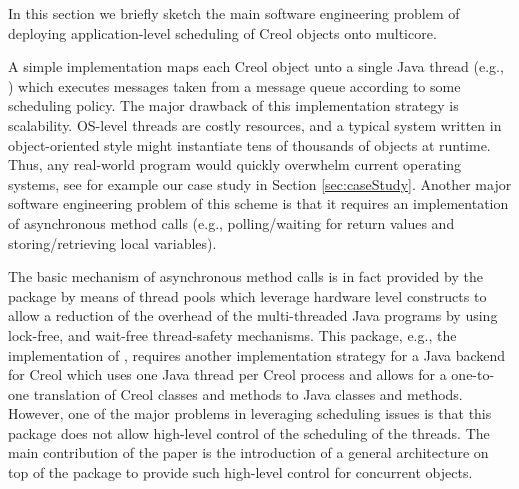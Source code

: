 In this section we briefly sketch the main software engineering problem of deploying 
application-level scheduling of Creol objects onto multicore.


A simple implementation  maps each Creol object unto a single Java thread (e.g., {}) which
executes messages taken from a message queue according to some
scheduling policy.  The major drawback of this implementation strategy
is scalability.  OS-level threads are costly resources, and a typical
system written in object-oriented style might instantiate tens of
thousands of objects at runtime.  Thus, any real-world program would
quickly overwhelm current operating systems, see for example our case study in Section \ref{sec:caseStudy}.
Another major software engineering problem of this scheme is that it requires an implementation of  asynchronous method calls 
(e.g., polling/waiting for return values and storing/retrieving local variables).

The basic mechanism of asynchronous method calls is in fact provided by the {} package by
means of thread pools
which leverage hardware level constructs  to allow a reduction of the overhead of the multi-threaded Java programs by using lock-free, and wait-free thread-safety mechanisms.
This package, e.g., the implementation of {}, requires another implementation strategy for a Java backend for Creol which uses
one Java thread per Creol process and allows for a one-to-one translation of Creol classes and methods to Java classes and methods.
However,  one of the major problems in leveraging scheduling issues is that this package does not allow high-level control of the scheduling of the threads.
The main contribution of the paper is the introduction of a general architecture on top of the {} package
to provide such high-level control for concurrent objects.




